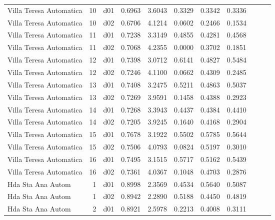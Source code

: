 \begin{landscape}
\begin{longtable}{p{2cm}rrrrrrrrrr}
 Villa Teresa Automatica  &         10 &     d01 &   0.6963 &  3.6043 &        0.3329 &           0.3342 &  0.3336 \\
 Villa Teresa Automatica  &         10 &     d02 &   0.6706 &  4.1214 &        0.0602 &           0.2466 &  0.1534 \\
 Villa Teresa Automatica  &         11 &     d01 &   0.7238 &  3.3149 &        0.4855 &           0.4281 &  0.4568 \\
 Villa Teresa Automatica  &         11 &     d02 &   0.7068 &  4.2355 &        0.0000 &           0.3702 &  0.1851 \\
 Villa Teresa Automatica  &         12 &     d01 &   0.7398 &  3.0712 &        0.6141 &           0.4827 &  0.5484 \\
 Villa Teresa Automatica  &         12 &     d02 &   0.7246 &  4.1100 &        0.0662 &           0.4309 &  0.2485 \\
 Villa Teresa Automatica  &         13 &     d01 &   0.7408 &  3.2475 &        0.5211 &           0.4863 &  0.5037 \\
 Villa Teresa Automatica  &         13 &     d02 &   0.7269 &  3.9591 &        0.1458 &           0.4388 &  0.2923 \\
 Villa Teresa Automatica  &         14 &     d01 &   0.7268 &  3.3943 &        0.4437 &           0.4384 &  0.4410 \\
 Villa Teresa Automatica  &         14 &     d02 &   0.7205 &  3.9245 &        0.1640 &           0.4168 &  0.2904 \\
 Villa Teresa Automatica  &         15 &     d01 &   0.7678 &  3.1922 &        0.5502 &           0.5785 &  0.5644 \\
 Villa Teresa Automatica  &         15 &     d02 &   0.7506 &  4.0793 &        0.0824 &           0.5197 &  0.3010 \\
 Villa Teresa Automatica  &         16 &     d01 &   0.7495 &  3.1515 &        0.5717 &           0.5162 &  0.5439 \\
 Villa Teresa Automatica  &         16 &     d02 &   0.7361 &  4.0367 &        0.1048 &           0.4703 &  0.2876 \\
       Hda Sta Ana Autom  &          1 &     d01 &   0.8998 &  2.3569 &        0.4534 &           0.5640 &  0.5087 \\
       Hda Sta Ana Autom  &          1 &     d02 &   0.8942 &  2.2890 &        0.5188 &           0.4450 &  0.4819 \\
       Hda Sta Ana Autom  &          2 &     d01 &   0.8921 &  2.5978 &        0.2213 &           0.4008 &  0.3111 \\

\end{longtable}
\end{landscape}
